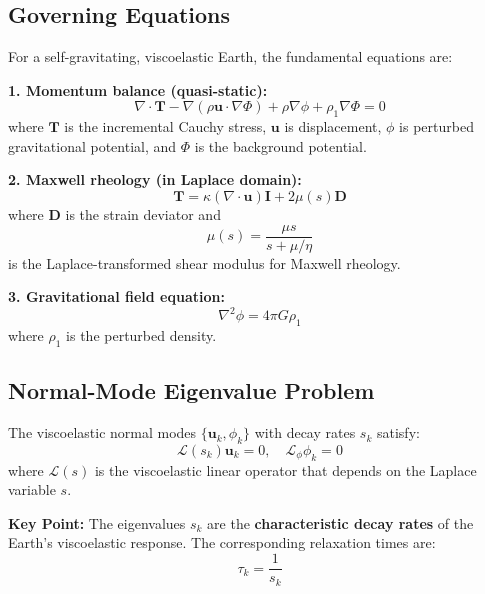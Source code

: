 \documentclass{article}
\begin{document}
\subsection{Governing Equations}

For a self-gravitating, viscoelastic Earth, the fundamental equations are:

\textbf{1. Momentum balance (quasi-static):}
\begin{equation}
\nabla \cdot \mathbf{T} - \nabla(\rho \mathbf{u} \cdot \nabla \Phi) + \rho \nabla \phi + \rho_1 \nabla \Phi = 0
\end{equation}
where $\mathbf{T}$ is the incremental Cauchy stress, $\mathbf{u}$ is displacement, $\phi$ is perturbed gravitational potential, and $\Phi$ is the background potential.

\textbf{2. Maxwell rheology (in Laplace domain):}
\begin{equation}
\mathbf{T} = \kappa(\nabla \cdot \mathbf{u})\mathbf{I} + 2\mu(s)\mathbf{D}
\end{equation}
where $\mathbf{D}$ is the strain deviator and
\begin{equation}
\mu(s) = \frac{\mu s}{s + \mu/\eta}
\end{equation}
is the Laplace-transformed shear modulus for Maxwell rheology.

\textbf{3. Gravitational field equation:}
\begin{equation}
\nabla^2 \phi = 4\pi G \rho_1
\end{equation}
where $\rho_1$ is the perturbed density.

\subsection{Normal-Mode Eigenvalue Problem}

The viscoelastic normal modes $\{\mathbf{u}_k, \phi_k\}$ with decay rates $s_k$ satisfy:
\begin{equation}
\mathcal{L}(s_k) \mathbf{u}_k = 0, \quad \mathcal{L}_\phi \phi_k = 0
\end{equation}
where $\mathcal{L}(s)$ is the viscoelastic linear operator that depends on the Laplace variable $s$.

\textbf{Key Point:} The eigenvalues $s_k$ are the \textbf{characteristic decay rates} of the Earth's viscoelastic response. The corresponding relaxation times are:
\begin{equation}
\tau_k = \frac{1}{s_k}
\end{equation}
\end{document}
